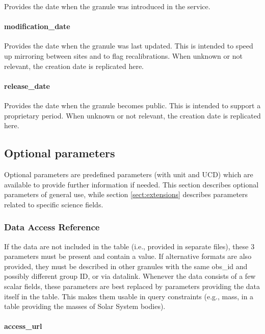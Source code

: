 \documentclass[11pt,a4paper]{ivoa}
\begin{document}
Provides the date when the granule was introduced in the service.

\paragraph{modification\_date}

Provides the date when the granule was last updated.
This is intended to speed up mirroring between sites and to flag recalibrations.
When unknown or not relevant, the creation date is replicated here.

\paragraph{release\_date}

Provides the date when the granule becomes public.  This is
intended to support a proprietary period.
When unknown or not relevant, the creation date is replicated here.

\subsection{Optional parameters}
\label{sect:optional}

Optional parameters are predefined parameters (with unit and UCD) which are available to
provide further information if needed.
This section describes optional parameters of general use,
while section \ref{sect:extensions} describes
parameters related to specific science fields.

\subsubsection{Data Access Reference}

If the data are not included in the table
(i.e., provided in separate files),
these 3 parameters must be present and contain a value. If alternative
formats are also provided, they must be described in other granules
with the same obs\_id and possibly different group ID, or via datalink.
Whenever the
data consists of a few scalar fields, these parameters are best replaced
by parameters providing the data itself in the table.  This makes them
usable in query constraints (e.g., mass, in a table providing the masses of
Solar System bodies).

\paragraph{access\_url}
\end{document}
